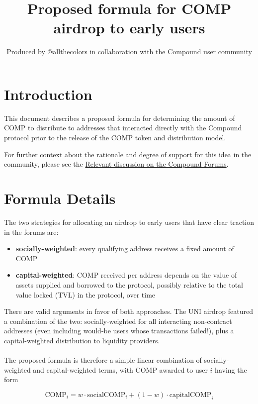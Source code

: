 \documentclass[12pt]{article}
\title{Proposed formula for COMP airdrop to early users}
\author{Produced by @allthecolors in collaboration with the Compound user community}
\begin{document}
\maketitle

\section{Introduction}

This document describes a proposed formula for determining the amount of COMP
to distribute to addresses that interacted directly with the Compound protocol
prior to the release of the COMP token and distribution model.

For further context about the rationale and degree of support for this idea
in the community, please see the
\href{https://www.comp.xyz/t/should-compound-retroactively-airdrop-tokens-to-early-users/595}{Relevant discussion on the Compound Forums}.


\section{Formula Details}

The two strategies for allocating an airdrop to early users that have clear traction
in the forums are:
\begin{itemize}
  \item{\textbf{socially-weighted}: every qualifying address receives a fixed amount of COMP}
  \item{\textbf{capital-weighted}: COMP received per address depends on the value of
        assets supplied and borrowed to the protocol, possibly relative to the total
        value locked (TVL) in the protocol, over time}
\end{itemize}
There are valid arguments in favor of both approaches. The UNI airdrop featured
a combination of the two: socially-weighted for all interacting non-contract addresses
(even including would-be users whose transactions failed!),
plus a capital-weighted distribution to liquidity providers.
\\\\
The proposed formula is therefore a simple linear combination of
socially-weighted and capital-weighted terms, with COMP awarded to user $i$ having the form

\begin{equation*}
\mathrm{COMP}_i = w\cdot\mathrm{socialCOMP}_i + \left(1-w\right)\cdot\mathrm{capitalCOMP}_i
\end{equation*}
\end{document}

